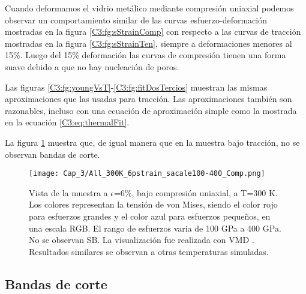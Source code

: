 Cuando deformamos el vidrio metálico mediante compresión uniaxial podemos observar un comportamiento similar de las curvas esfuerzo-deformación mostradas en la figura \ref{C3:fg:sStrainComp} con respecto a las curvas de tracción mostradas en la figura \ref{C3:fg:sStrainTen}, siempre a deformaciones menores al 15\%. Luego del 15\% deformación las curvas de compresión tienen una forma suave debido a que no hay nucleación de poros.


Las figuras \ref{C3:fg:youngVsT}-\ref{C3:fg:fitDosTercios} muestran las mismas aproximaciones que las usadas para tracción. Las aproximaciones también son razonables, incluso con una ecuación de aproximación simple como la mostrada en la ecuación \ref{C3:eq:thermalFit}.


La figura \ref{C3:fg:sampleComp} muestra que, de igual manera que en la muestra bajo tracción, no se observan bandas de corte.


\begin{figure}[htp]
\centering
\texttt{[image: Cap\_3/All\_300K\_6pstrain\_sacale100-400\_Comp.png]}
\caption[Vista de la muestra a $\epsilon$=6\%, bajo compresión uniaxial, a T=300 K.]{Vista de la muestra a $\epsilon$=6\%, bajo compresión uniaxial, a T=300 K. Los colores representan la tensión de von Mises, siendo el color rojo para esfuerzos grandes y el color azul para esfuerzos pequeños, en una escala RGB. El rango de esfuerzos varia de 100 GPa a 400 GPa. No se observan SB. La visualización fue realizada con VMD \citep{humphrey96}. Resultados similares se observan a otras temperaturas simuladas.}
\label{C3:fg:sampleComp}
\end{figure}

\subsection{Bandas de corte}
\label{S3_3_1}

